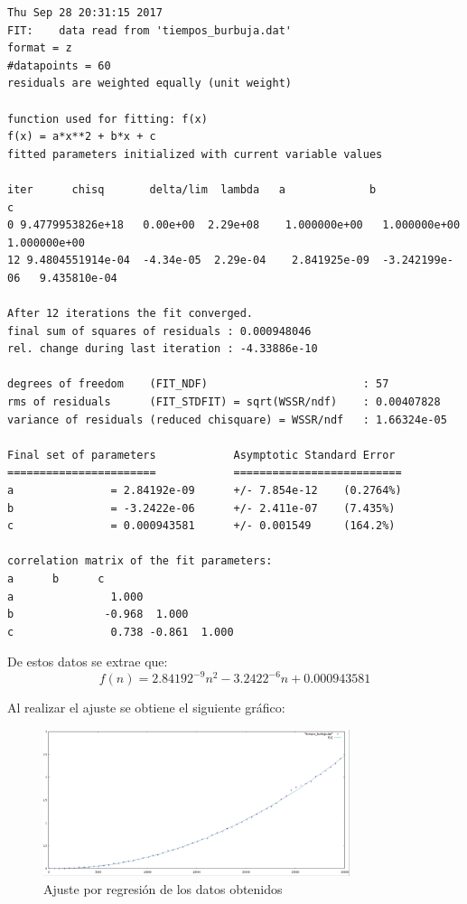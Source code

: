 \documentclass[paper=a4, fontsize=10pt]{scrartcl} %
\begin{document}
\begin{lstlisting}
Thu Sep 28 20:31:15 2017
FIT:    data read from 'tiempos_burbuja.dat'
format = z
#datapoints = 60
residuals are weighted equally (unit weight)

function used for fitting: f(x)
f(x) = a*x**2 + b*x + c
fitted parameters initialized with current variable values

iter      chisq       delta/lim  lambda   a             b             c            
0 9.4779953826e+18   0.00e+00  2.29e+08    1.000000e+00   1.000000e+00   1.000000e+00
12 9.4804551914e-04  -4.34e-05  2.29e-04    2.841925e-09  -3.242199e-06   9.435810e-04

After 12 iterations the fit converged.
final sum of squares of residuals : 0.000948046
rel. change during last iteration : -4.33886e-10

degrees of freedom    (FIT_NDF)                        : 57
rms of residuals      (FIT_STDFIT) = sqrt(WSSR/ndf)    : 0.00407828
variance of residuals (reduced chisquare) = WSSR/ndf   : 1.66324e-05

Final set of parameters            Asymptotic Standard Error
=======================            ==========================
a               = 2.84192e-09      +/- 7.854e-12    (0.2764%)
b               = -3.2422e-06      +/- 2.411e-07    (7.435%)
c               = 0.000943581      +/- 0.001549     (164.2%)

correlation matrix of the fit parameters:
a      b      c      
a               1.000 
b              -0.968  1.000 
c               0.738 -0.861  1.000 
\end{lstlisting}

De estos datos se extrae que: 
\[
f(n) = 2.84192^{-9}n^2 -3.2422^{-6}n + 0.000943581
\]

Al realizar el ajuste se obtiene el siguiente gráfico:

\begin{figure}[H] %
	\centering
	\label{lsblk}
	\includegraphics[width=0.8\textwidth]{../imgs/c3.PNG}
	\caption{Ajuste por regresión de los datos obtenidos} 
\end{figure}
\end{document}
